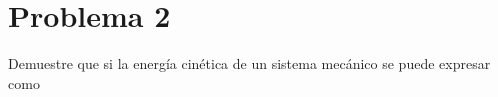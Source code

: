 \documentclass[a4paper,10pt]{article}
\numberwithin{equation}{section}
\begin{document}
% 
% 
% 
% 
% 
% 
% 
% 







\section{Problema 2}

Demuestre que si la energía cinética de un sistema mecánico se puede expresar como
\end{document}
